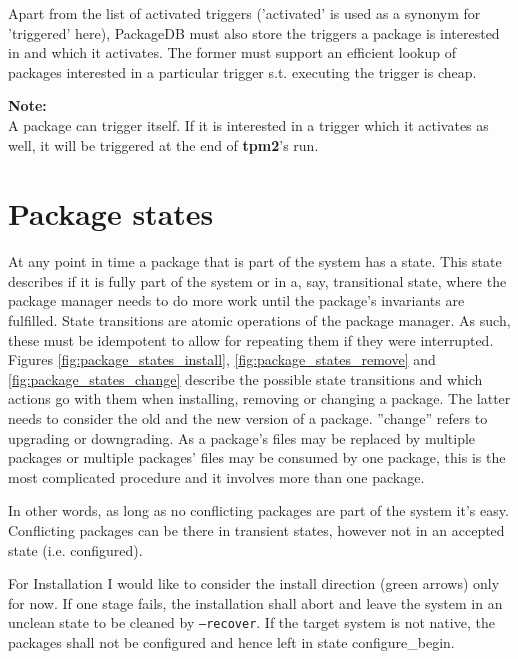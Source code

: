 \documentclass[a4paper]{scrartcl}
\newcommand{\program}[1]{\textbf{#1}}
\newenvironment{notebox}
	{\begin{tcolorbox}\textsf{\textbf{Note:}}\\}
	{\end{tcolorbox}}
\begin{document}
	Apart from the list of activated triggers ('activated' is used as a synonym for 'triggered' here), PackageDB must also store the triggers a package is interested in and which it activates. The former must support an efficient lookup of packages interested in a particular trigger s.t. executing the trigger is cheap.
	
	\begin{notebox}
		A package can trigger itself. If it is interested in a trigger which it activates as well, it will be triggered at the end of \program{tpm2}'s run.
	\end{notebox}
	
	
	\section{Package states}
	\label{sec:package_states}
	
	At any point in time a package that is part of the system has a state. This state describes if it is fully part of the system or in a, say, transitional state, where the package manager needs to do more work until the package's invariants are fulfilled. State transitions are atomic operations of the package manager. As such, these must be idempotent to allow for repeating them if they were interrupted. Figures \ref{fig:package_states_install}, \ref{fig:package_states_remove} and \ref{fig:package_states_change} describe the possible state transitions and which actions go with them when installing, removing or changing a package. The latter needs to consider the old and the new version of a package. ''change'' refers to upgrading or downgrading. As a package's files may be replaced by multiple packages or multiple packages' files may be consumed by one package, this is the most complicated procedure and it involves more than one package.
	
	In other words, as long as no conflicting packages are part of the system it's easy. Conflicting packages can be there in transient states, however not in an accepted state (i.e. configured).
	
	For Installation I would like to consider the install direction (green arrows) only for now. If one stage fails, the installation shall abort and leave the system in an unclean state to be cleaned by \texttt{--recover}. If the target system is not native, the packages shall not be configured and hence left in state configure\_begin.
	
\end{document}
